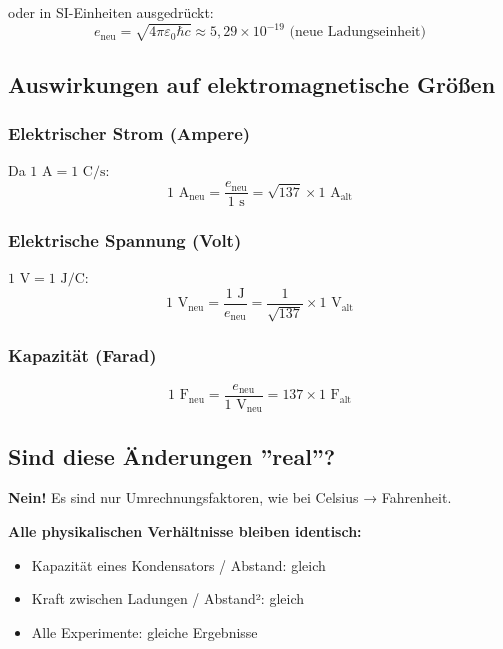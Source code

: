 	oder in SI-Einheiten ausgedrückt:
	\begin{equation}
		e_{\text{neu}} = \sqrt{4\pi\varepsilon_0\hbar c} \approx 5{,}29 \times 10^{-19} \text{ (neue Ladungseinheit)}
	\end{equation}
	
	\subsection{Auswirkungen auf elektromagnetische Größen}
	
	\subsubsection{Elektrischer Strom (Ampere)}
	
	Da $1 \text{ A} = 1 \text{ C/s}$:
	\begin{equation}
		1 \text{ A}_{\text{neu}} = \frac{e_{\text{neu}}}{1 \text{ s}} = \sqrt{137} \times 1 \text{ A}_{\text{alt}}
	\end{equation}
	
	\subsubsection{Elektrische Spannung (Volt)}
	
	$1 \text{ V} = 1 \text{ J/C}$:
	\begin{equation}
		1 \text{ V}_{\text{neu}} = \frac{1 \text{ J}}{e_{\text{neu}}} = \frac{1}{\sqrt{137}} \times 1 \text{ V}_{\text{alt}}
	\end{equation}
	
	\subsubsection{Kapazität (Farad)}
	
	\begin{equation}
		1 \text{ F}_{\text{neu}} = \frac{e_{\text{neu}}}{1 \text{ V}_{\text{neu}}} = 137 \times 1 \text{ F}_{\text{alt}}
	\end{equation}
	
	\subsection{Sind diese Änderungen ''real''?}
	
	\textbf{Nein!} Es sind nur Umrechnungsfaktoren, wie bei Celsius → Fahrenheit.
	
	\textbf{Alle physikalischen Verhältnisse bleiben identisch:}
	\begin{itemize}
		\item Kapazität eines Kondensators / Abstand: gleich
		\item Kraft zwischen Ladungen / Abstand²: gleich
		\item Alle Experimente: gleiche Ergebnisse
	\end{itemize}
	
